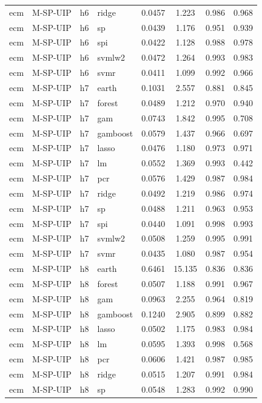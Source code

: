\begin{ThreePartTable}
\begin{longtable}[t]{llclcccc}
ecm & M-SP-UIP & h6 & ridge & 0.0457 & 1.223 & 0.986 & 0.968\\
ecm & M-SP-UIP & h6 & sp & 0.0439 & 1.176 & 0.951 & 0.939\\
ecm & M-SP-UIP & h6 & spi & 0.0422 & 1.128 & 0.988 & 0.978\\
ecm & M-SP-UIP & h6 & svmlw2 & 0.0472 & 1.264 & 0.993 & 0.983\\
ecm & M-SP-UIP & h6 & svmr & 0.0411 & 1.099 & 0.992 & 0.966\\
\addlinespace
ecm & M-SP-UIP & h7 & earth & 0.1031 & 2.557 & 0.881 & 0.845\\
ecm & M-SP-UIP & h7 & forest & 0.0489 & 1.212 & 0.970 & 0.940\\
ecm & M-SP-UIP & h7 & gam & 0.0743 & 1.842 & 0.995 & 0.708\\
ecm & M-SP-UIP & h7 & gamboost & 0.0579 & 1.437 & 0.966 & 0.697\\
ecm & M-SP-UIP & h7 & lasso & 0.0476 & 1.180 & 0.973 & 0.971\\
ecm & M-SP-UIP & h7 & lm & 0.0552 & 1.369 & 0.993 & 0.442\\
ecm & M-SP-UIP & h7 & pcr & 0.0576 & 1.429 & 0.987 & 0.984\\
ecm & M-SP-UIP & h7 & ridge & 0.0492 & 1.219 & 0.986 & 0.974\\
ecm & M-SP-UIP & h7 & sp & 0.0488 & 1.211 & 0.963 & 0.953\\
ecm & M-SP-UIP & h7 & spi & 0.0440 & 1.091 & 0.998 & 0.993\\
ecm & M-SP-UIP & h7 & svmlw2 & 0.0508 & 1.259 & 0.995 & 0.991\\
ecm & M-SP-UIP & h7 & svmr & 0.0435 & 1.080 & 0.987 & 0.954\\
\addlinespace
ecm & M-SP-UIP & h8 & earth & 0.6461 & 15.135 & 0.836 & 0.836\\
ecm & M-SP-UIP & h8 & forest & 0.0507 & 1.188 & 0.991 & 0.967\\
ecm & M-SP-UIP & h8 & gam & 0.0963 & 2.255 & 0.964 & 0.819\\
ecm & M-SP-UIP & h8 & gamboost & 0.1240 & 2.905 & 0.899 & 0.882\\
ecm & M-SP-UIP & h8 & lasso & 0.0502 & 1.175 & 0.983 & 0.984\\
ecm & M-SP-UIP & h8 & lm & 0.0595 & 1.393 & 0.998 & 0.568\\
ecm & M-SP-UIP & h8 & pcr & 0.0606 & 1.421 & 0.987 & 0.985\\
ecm & M-SP-UIP & h8 & ridge & 0.0515 & 1.207 & 0.991 & 0.984\\
ecm & M-SP-UIP & h8 & sp & 0.0548 & 1.283 & 0.992 & 0.990\\

\end{longtable}
\end{ThreePartTable}
